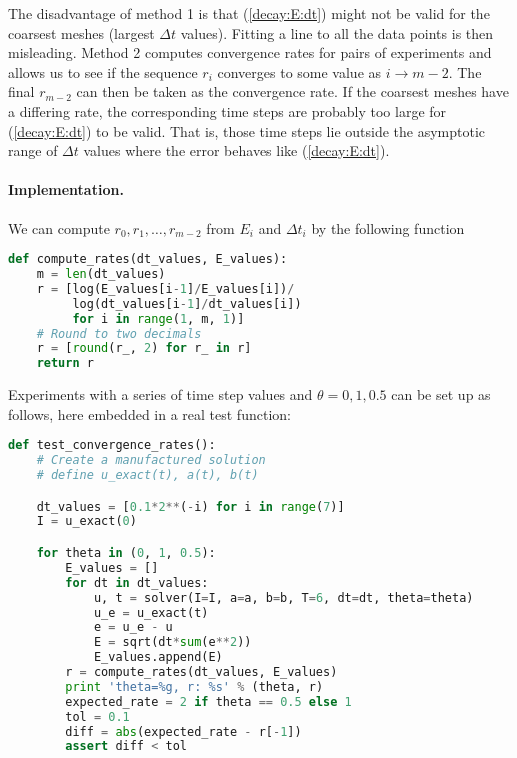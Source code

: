 \documentclass[graybox,sectrefs,envcountresetchap,open=right,final]{svmonodo}
\begin{document}
The disadvantage of method 1 is that (\ref{decay:E:dt}) might not be valid
for the coarsest meshes (largest $\Delta t$ values). Fitting a line
to all the data points is then misleading.  Method 2 computes
convergence rates for pairs of experiments and allows us to see
if the sequence $r_i$ converges to some value as $i\rightarrow m-2$.
The final $r_{m-2}$ can then be taken as the convergence rate.
If the coarsest meshes have a differing rate, the corresponding
time steps are probably too large for (\ref{decay:E:dt}) to be valid.
That is, those time steps lie outside the asymptotic range of
$\Delta t$ values where the error behaves like (\ref{decay:E:dt}).

\paragraph{Implementation.}
We can compute $r_0, r_1, \ldots, r_{m-2}$ from $E_i$ and $\Delta t_i$
by the following function










\begin{lstlisting}[language=python,style=blue1_bluegreen]
def compute_rates(dt_values, E_values):
    m = len(dt_values)
    r = [log(E_values[i-1]/E_values[i])/
         log(dt_values[i-1]/dt_values[i])
         for i in range(1, m, 1)]
    # Round to two decimals
    r = [round(r_, 2) for r_ in r]
    return r

\end{lstlisting}


Experiments with a series of time step values and $\theta=0,1,0.5$
can be set up as follows, here embedded in a real test function:























\begin{lstlisting}[language=python,style=blue1_bluegreen]
def test_convergence_rates():
    # Create a manufactured solution
    # define u_exact(t), a(t), b(t)

    dt_values = [0.1*2**(-i) for i in range(7)]
    I = u_exact(0)

    for theta in (0, 1, 0.5):
        E_values = []
        for dt in dt_values:
            u, t = solver(I=I, a=a, b=b, T=6, dt=dt, theta=theta)
            u_e = u_exact(t)
            e = u_e - u
            E = sqrt(dt*sum(e**2))
            E_values.append(E)
        r = compute_rates(dt_values, E_values)
        print 'theta=%g, r: %s' % (theta, r)
        expected_rate = 2 if theta == 0.5 else 1
        tol = 0.1
        diff = abs(expected_rate - r[-1])
        assert diff < tol

\end{lstlisting}
\end{document}
